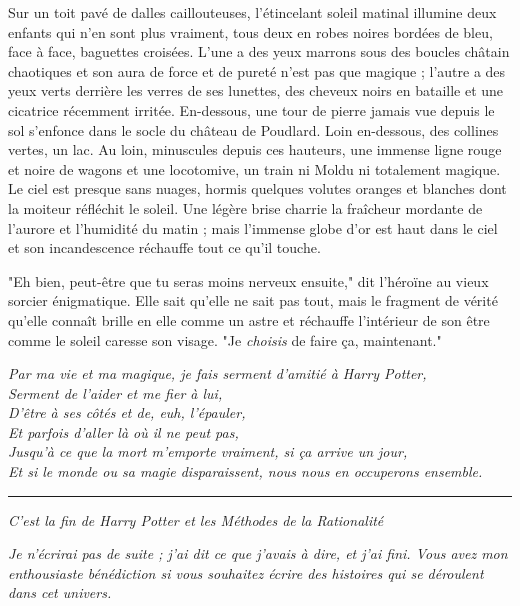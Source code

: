 Sur un toit pavé de dalles caillouteuses, l'étincelant soleil matinal illumine deux enfants qui n'en sont plus vraiment, tous deux en robes noires bordées de bleu, face à face, baguettes croisées. L'une a des yeux marrons sous des boucles châtain chaotiques et son aura de force et de pureté n'est pas que magique ; l'autre a des yeux verts derrière les verres de ses lunettes, des cheveux noirs en bataille et une cicatrice récemment irritée. En-dessous, une tour de pierre jamais vue depuis le sol s'enfonce dans le socle du château de Poudlard. Loin en-dessous, des collines vertes, un lac. Au loin, minuscules depuis ces hauteurs, une immense ligne rouge et noire de wagons et une locotomive, un train ni Moldu ni totalement magique. Le ciel est presque sans nuages, hormis quelques volutes oranges et blanches dont la moiteur réfléchit le soleil. Une légère brise charrie la fraîcheur mordante de l'aurore et l'humidité du matin ; mais l'immense globe d'or est haut dans le ciel et son incandescence réchauffe tout ce qu'il touche.

"Eh bien, peut-être que tu seras moins nerveux ensuite," dit l'héroïne au vieux sorcier énigmatique. Elle sait qu'elle ne sait pas tout, mais le fragment de vérité qu'elle connaît brille en elle comme un astre et réchauffe l'intérieur de son être comme le soleil caresse son visage. "Je \emph{choisis}  de faire ça, maintenant."

\emph{Par ma vie et ma magique, je fais serment d'amitié à Harry Potter,} \\\emph{Serment de l'aider et me fier à lui,} \\\emph{D'être à ses côtés et de, euh, l'épauler,} \\\emph{Et parfois d'aller là où il ne peut pas,} \\\emph{Jusqu'à ce que la mort m'emporte vraiment, si ça arrive un jour,} \\\emph{Et si le monde ou sa magie disparaissent, nous nous en occuperons ensemble.} 
\par\noindent\rule{\textwidth}{0.4pt}

\begin{center}\emph{C'est la fin de Harry Potter et les Méthodes de la Rationalité} \end{center}



\begin{center}\emph{Je n'écrirai pas de suite ; j'ai dit ce que j'avais à dire, et j'ai fini. Vous avez mon enthousiaste bénédiction si vous souhaitez écrire des histoires qui se déroulent dans cet univers.} \end{center}




